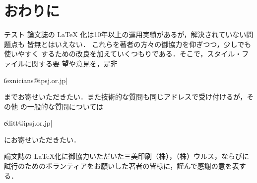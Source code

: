 \section{おわりに}
テスト
論文誌の {\LaTeX} 化は10年以上の運用実績があるが，解決されていない問題点も
皆無とはいえない．
これらを著者の方々の御協力を仰ぎつつ，少しでも使いやすく
するための改良を加えていくつもりである．そこで，スタイル・ファイルに関する要
望や意見を，是非
%
\begin{Quote}
\|texnicians@ipsj.or.jp|
\end{Quote}
%
までお寄せいただきたい．また技術的な質問も同じアドレスで受け付けるが，その他
の一般的な質問については
%
\begin{Quote}
\|editt@ipsj.or.jp|
\end{Quote}
%
にお寄せいただきたい．

\begin{acknowledgment}
論文誌の {\LaTeX}化に御協力いただいた三美印刷（株），（株）ウルス，ならびに
試行のためのボランティアをお願いした著者の皆様に，謹んで感謝の意を表する．
\end{acknowledgment}

